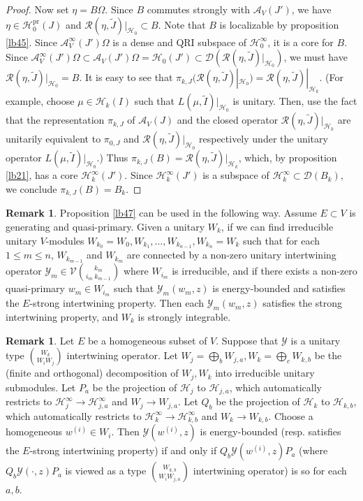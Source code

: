 \documentclass[12pt,a4paper]{article}
\theoremstyle{definition}
\newtheorem{rem}[df]{Remark}
\theoremstyle{plain}
\newcommand{\mc}{\mathcal}
\newcommand{\wtd}{\widetilde}
\newcommand{\Dom}{\scr D}
\newcommand{\scr}{\mathscr}
\newcommand{\pr}{\mathrm{pr}}
\numberwithin{equation}{subsection}
\begin{document}
\begin{proof}
Now set $\eta=B\Omega$. Since $B$ commutes strongly with $\mc A_V(J')$, we have $\eta\in\mc H_0^\pr(J)$ and $\scr R(\eta,\wtd J)|_{\mc H_0}\subset B$. Note that $B$ is localizable by proposition \ref{lb45}. Since $\mc A_V^\infty(J')\Omega$ is a dense and QRI subspace of $\mc H_0^\infty$, it is a core for $B$. Since $\mc A_V^\infty(J')\Omega\subset \mc A_V(J')\Omega=\mc H_0(J')\subset\Dom(\scr R(\eta,\wtd J)|_{\mc H_0})$,  we must have $\scr R(\eta,\wtd J)|_{\mc H_0}=B$. It is easy to see that $\pi_{k,J}(\scr R(\eta,\wtd J)|_{\mc H_0})=\scr R(\eta,\wtd J)|_{\mc H_k}$. (For example,  choose $\mu\in\mc H_k(I)$ such that $L(\mu,\wtd I)|_{\mc H_0}$ is unitary. Then, use the fact that the representation $\pi_{k,J}$ of $\mc A_V(J)$ and the closed operator $\scr R(\eta,\wtd J)|_{\mc H_k}$ are unitarily equivalent  to $\pi_{0,J}$ and $\scr R(\eta,\wtd J)|_{\mc H_0}$ respectively under the unitary operator $L(\mu,\wtd I)|_{\mc H_0}$.) Thus $\pi_{k,J}(B)=\scr R(\eta,\wtd J)|_{\mc H_k}$, which, by proposition \ref{lb21}, has a core $\mc H_k^\infty(J')$. Since  $\mc H_k^\infty(J')$ is a subspace of $\mc H_k^\infty\subset\Dom(B_k)$, we conclude $\pi_{k,J}(B)=B_k$.
\end{proof}



\begin{rem}\label{lb50}
Proposition \ref{lb47} can be used in the following way. Assume $E\subset V$ is generating and quasi-primary. Given a unitary $W_k$, if we can find irreducible unitary $V$-modules $W_{k_0}=W_0,W_{k_1},\dots,W_{k_{n-1}},W_{k_n}=W_k$ such that for each $1\leq m\leq n$, $W_{k_{m-1}}$ and $W_{k_m}$ are connected by a non-zero unitary intertwining operator $\mc Y_m\in\mc V{k_m\choose {i_m}~k_{m-1}}$ where $W_{i_m}$ is irreducible, and if there exists a non-zero quasi-primary $w_m\in W_{i_m}$ such that $\mc Y_m(w_m,z)$ is energy-bounded and satisfies the $E$-strong intertwining property. Then each  $\mc Y_m(w_m,z)$ satisfies the strong intertwining property, and $W_k$ is strongly integrable.
\end{rem}




\begin{rem}\label{lb99}
Let $E$ be a homogeneous subset of $V$. Suppose that $\mc Y$ is a unitary type $W_k\choose W_iW_j$ intertwining operator. Let $W_j=\bigoplus_b W_{j,a},W_k=\bigoplus_c W_{k,b}$ be the (finite and orthogonal) decomposition of $W_j,W_k$ into irreducible unitary submodules. Let $P_a$ be the projection of $\mc H_j$ to $\mc H_{j,a}$, which automatically restricts to $\mc H_j^\infty\rightarrow\mc H_{j,a}^\infty$ and $W_j\rightarrow W_{j,a}$. Let $Q_b$ be the projection of $\mc H_k$ to $\mc H_{k,b}$, which automatically restricts to $\mc H_k^\infty\rightarrow\mc H_{k,b}^\infty$ and $W_k\rightarrow W_{k,b}$. Choose a homogeneous $w^{(i)}\in W_i$. Then $\mc Y(w^{(i)},z)$ is energy-bounded (resp. satisfies the $E$-strong intertwining property) if and only if $Q_b\mc Y(w^{(i)},z) P_a$ (where $Q_b\mc Y(\cdot,z) P_a$ is viewed as a type $W_{k,b}\choose W_iW_{j,a}$ intertwining operator) is so for each $a,b$.
\end{rem}
\end{document}
